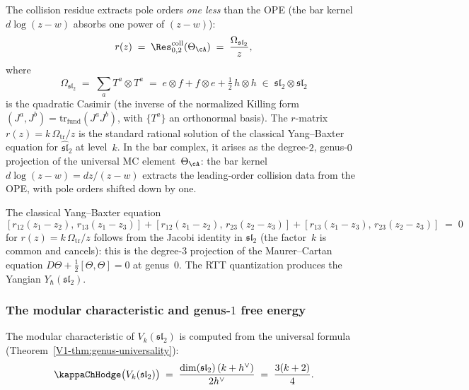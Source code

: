 The collision residue extracts pole orders \emph{one less} than
the OPE (the bar kernel $d\log(z-w)$ absorbs one power of
$(z-w)$):
\begin{equation}\label{eq:benchmark-r-matrix}
 r(z)
 \;=\;
 \Res^{\mathrm{coll}}_{0,2}(\Theta_\cA)
 \;=\;
 \frac{\Omega_{\mathfrak{sl}_2}}{z},
\end{equation}
where
\begin{equation}\label{eq:benchmark-casimir}
 \Omega_{\mathfrak{sl}_2}
 \;=\;
 \sum_a T^a \otimes T^a
 \;=\;
 e \otimes f + f \otimes e
 + \tfrac{1}{2}\, h \otimes h
 \;\in\;
 \mathfrak{sl}_2 \otimes \mathfrak{sl}_2
\end{equation}
is the quadratic Casimir (the inverse of the normalized
Killing form $(J^a, J^b) = \mathrm{tr}_{\mathrm{fund}}(J^a J^b)$,
with $\{T^a\}$ an orthonormal basis).
The $r$-matrix $r(z) = k\,\Omega_{\mathrm{tr}}/z$ is the standard rational
solution of the classical Yang--Baxter equation for
$\widehat{\mathfrak{sl}}_2$ at level~$k$. In the bar complex, it arises as the
degree-$2$, genus-$0$ projection of the universal MC
element~$\Theta_\cA$: the bar kernel $d\log(z-w) = dz/(z-w)$
extracts the leading-order collision data from the OPE, with
pole orders shifted down by one.

The classical Yang--Baxter equation
\begin{equation}\label{eq:benchmark-cybe}
 [r_{12}(z_1 - z_2),\, r_{13}(z_1 - z_3)]
 +
 [r_{12}(z_1 - z_2),\, r_{23}(z_2 - z_3)]
 +
 [r_{13}(z_1 - z_3),\, r_{23}(z_2 - z_3)]
 \;=\; 0
\end{equation}
for $r(z) = k\,\Omega_{\mathrm{tr}}/z$ follows from the Jacobi identity
in $\mathfrak{sl}_2$ (the factor~$k$ is common and cancels): this is the degree-$3$ projection of the
Maurer--Cartan equation $D\Theta + \tfrac{1}{2}[\Theta,\Theta] = 0$
at genus~$0$. The RTT quantization produces the Yangian
$Y_\hbar(\mathfrak{sl}_2)$.


\subsubsection{The modular characteristic and genus-$1$ free energy}
\label{subsubsec:benchmark-modular-characteristic}

The modular characteristic of $V_k(\mathfrak{sl}_2)$ is
computed from the universal formula
(Theorem~\ref*{V1-thm:genus-universality}):
\begin{equation}\label{eq:benchmark-kappa}
 \kappaChHodge\bigl(V_k(\mathfrak{sl}_2)\bigr)
 \;=\;
 \frac{\dim(\mathfrak{sl}_2)\,(k + h^\vee)}{2h^\vee}
 \;=\;
 \frac{3(k + 2)}{4}.
\end{equation}

